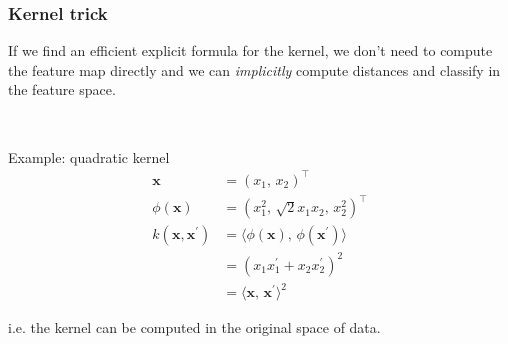 \documentclass{beamer}
\begin{document}
    \begin{frame}
        \frametitle{Kernel trick}
    
        If we find an efficient explicit formula for the kernel, we don't need to compute the feature map directly and we can \emph{implicitly} compute distances and classify in the feature space.

        \ \\
        \small
        \begin{exampleblock}{\small Example: quadratic kernel}
            \begin{align*}
                \mathbf{x} &= \left( x_1,\, x_2 \right)^\top\\
                \phi\left( \mathbf{x} \right) &= \left( x_1^2,\, \sqrt{2}x_1x_2,\, x_2^2 \right)^\top\\
                k\left( \mathbf{x}, \mathbf{x}^\prime \right) &= \langle \phi\left( \mathbf{x} \right),\, \phi\left( \mathbf{x}^\prime \right)\rangle \\
                &= \left( x_1 x_1^\prime + x_2 x_2^\prime \right)^2\\
                &= \langle \mathbf{x},\, \mathbf{x}^\prime\rangle^2
            \end{align*}

            i.e. the kernel can be computed in the original space of data.
        \end{exampleblock}
    
    \end{frame}
\end{document}
